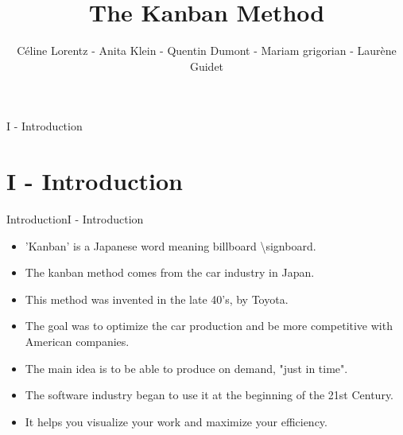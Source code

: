 \documentclass[10pt]{beamer}
\author{Céline Lorentz - Anita Klein - Quentin Dumont - Mariam grigorian - Laurène Guidet}
\title{The Kanban Method}
\newcommand{\PI}{I - Introduction}
\begin{document}
    
\begin{frame}{\PI}

    \maketitle

\end{frame}
\section{\PI} 
\begin{frame}{Introduction}{\PI} 
    \begin{itemize}
        \item 'Kanban' is a Japanese word meaning billboard \textbackslash signboard. 
        \item The kanban method comes from the car industry in Japan.
        \item This method was invented in the late 40's, by Toyota.
        \item The goal was to optimize the car production and be more competitive with American companies.
        \item The main idea is to be able to produce on demand, "just in time".
        \item The software industry began to use it at the beginning of the 21st Century.
        \item It helps you visualize your work and maximize your efficiency.
    \end{itemize}  

\end{frame}
\end{document}
